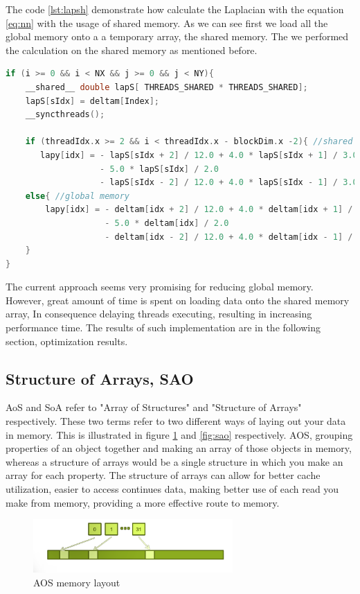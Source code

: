 The code \ref{lst:lapsh} demonstrate how calculate the Laplacian with the equation \ref{eq:nn} with the usage of shared memory. As we can see first we load all the global memory onto a a temporary array, the shared memory. The we performed the calculation on the shared memory as mentioned before.

\begin{lstlisting}[language=C++, label={lst:lapsh}, caption={Laplacian evaluating using shared memory with boundaries condition}]
if (i >= 0 && i < NX && j >= 0 && j < NY){
    __shared__ double lapS[ THREADS_SHARED * THREADS_SHARED];
    lapS[sIdx] = deltam[Index];
    __syncthreads();

    if (threadIdx.x >= 2 && i < threadIdx.x - blockDim.x -2){ //shared
       lapy[idx] = - lapS[sIdx + 2] / 12.0 + 4.0 * lapS[sIdx + 1] / 3.0
			  	   - 5.0 * lapS[sIdx] / 2.0
			  	   - lapS[sIdx - 2] / 12.0 + 4.0 * lapS[sIdx - 1] / 3.0;
	else{ //global memory
		lapy[idx] = - deltam[idx + 2] / 12.0 + 4.0 * deltam[idx + 1] / 3.0
			  		- 5.0 * deltam[idx] / 2.0
			  		- deltam[idx - 2] / 12.0 + 4.0 * deltam[idx - 1] / 3.0;
	}
}
\end{lstlisting}

The current approach seems very promising for reducing global memory. However, great amount of time is spent on loading data onto the shared memory array, In consequence delaying threads executing, resulting in increasing performance time. The results of such implementation are in the following section, optimization results.

\subsection{Structure of Arrays, SAO}

AoS and SoA refer to "Array of Structures" and "Structure of Arrays" respectively. These two terms refer to two different ways of laying out your data in memory. This is illustrated in figure \ref{fig:aos} and \ref{fig:sao} respectively. AOS, grouping properties of an object together and making an array of those objects in memory, whereas a structure of arrays would be a single structure in which you make an array for each property. The structure of arrays can allow for better cache utilization, easier to access continues data, making better use of each read you make from memory, providing a more effective route to memory. 

\begin{figure}[htbp]
	\centering
		\includegraphics[width=0.68\textwidth]{Figures/aos.png}
		\smallskip
	\caption[Array of structures (AOS)]{AOS memory layout }
	\label{fig:aos}
\end{figure}


